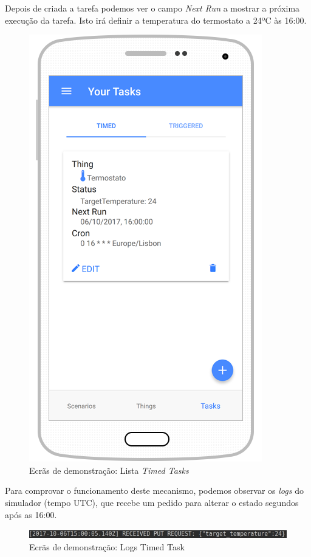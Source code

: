 Depois de criada a tarefa podemos ver o campo \textit{Next Run} a mostrar a próxima execução da tarefa. Isto irá definir a temperatura do termostato a 24ºC às 16:00.

\begin{figure}[H]
  \centering
        \includegraphics[scale=0.6]{img/demo/show_timed_task.png}
  \caption{Ecrãs de demonstração: Lista \textit{Timed Tasks}}
\end{figure}

Para comprovar o funcionamento deste mecanismo, podemos observar os \textit{logs} do simulador (tempo UTC), que recebe um pedido para alterar o estado segundos após as 16:00.

\begin{figure}[H]
  \centering
        \includegraphics[scale=0.6]{img/demo/timed_task_log.jpg}
  \caption{Ecrãs de demonstração: Logs {Timed Task}}
\end{figure}

